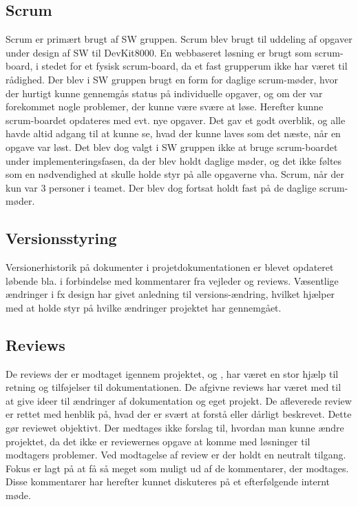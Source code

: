 \subsection{Scrum}
Scrum er primært brugt af SW gruppen. Scrum blev brugt til uddeling af opgaver under design af SW til DevKit8000. En webbaseret løsning er brugt som scrum-board, i stedet for et fysisk scrum-board, da et fast grupperum ikke har været til rådighed. Der blev i SW gruppen brugt en form for daglige scrum-møder, hvor der hurtigt kunne gennemgås status på individuelle opgaver, og om der var forekommet nogle problemer, der kunne være svære at løse. Herefter kunne scrum-boardet opdateres med evt. nye opgaver. Det gav et godt overblik, og alle havde altid adgang til at kunne se, hvad der kunne laves som det næste, når en opgave var løst. Det blev dog valgt i SW gruppen ikke at bruge scrum-boardet under implementeringsfasen, da der blev holdt daglige møder, og det ikke føltes som en nødvendighed at skulle holde styr på alle opgaverne vha. Scrum, når der kun var 3 personer i teamet. Der blev dog fortsat holdt fast på de daglige scrum-møder.

\clearpage

\subsection{Versionsstyring}
Versionerhistorik på dokumenter i projetdokumentationen er blevet opdateret løbende bla. i forbindelse med kommentarer fra vejleder og reviews. Væsentlige ændringer i fx design har givet anledning til versions-ændring, hvilket hjælper med at holde styr på hvilke ændringer projektet har gennemgået.

\subsection{Reviews}
De reviews der er modtaget igennem projektet, \cite{lib:Review1} og \cite{lib:Review2}, har været en stor hjælp til retning og tilføjelser til dokumentationen. De afgivne reviews har været med til at give ideer til ændringer af dokumentation og eget projekt. De afleverede review er rettet med henblik på, hvad der er svært at forstå eller dårligt beskrevet. Dette gør reviewet objektivt. Der medtages ikke forslag til, hvordan man kunne ændre projektet, da det ikke er reviewernes opgave at komme med løsninger til modtagers problemer. Ved modtagelse af review er der holdt en neutralt tilgang. Fokus er lagt på at få så meget som muligt ud af de kommentarer, der modtages. Disse kommentarer har herefter kunnet diskuteres på et efterfølgende internt møde.

\clearpage